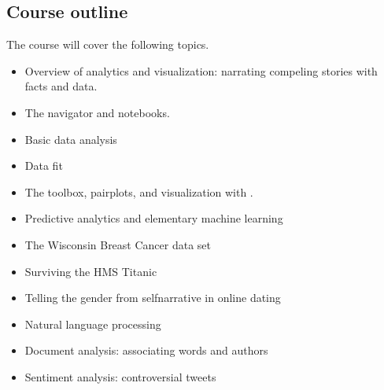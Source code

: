 \documentclass[letterpaper,10pt,english]{sphinxmanual}
\begin{document}
\subsection{Course outline}
\label{\detokenize{COMP180/organization:course-outline}}
The course will cover the following topics.
\begin{itemize}
\item {} 
Overview of analytics and visualization: narrating compeling stories with facts and data.

\item {} 
The  navigator and  notebooks.

\item {} 
Basic data analysis

\end{itemize}
\begin{itemize}
\item {} 
Data fit

\item {} 
The  toolbox, pairplots, and visualization with .

\end{itemize}
\begin{itemize}
\item {} 
Predictive analytics and elementary machine learning

\end{itemize}
\begin{itemize}
\item {} 
The Wisconsin Breast Cancer data set

\item {} 
Surviving the HMS Titanic

\item {} 
Telling the gender from self\sphinxhyphen{}narrative in online dating

\end{itemize}
\begin{itemize}
\item {} 
Natural language processing

\end{itemize}
\begin{itemize}
\item {} 
Document analysis: associating words and authors

\item {} 
Sentiment analysis: controversial tweets

\end{itemize}
\end{document}
